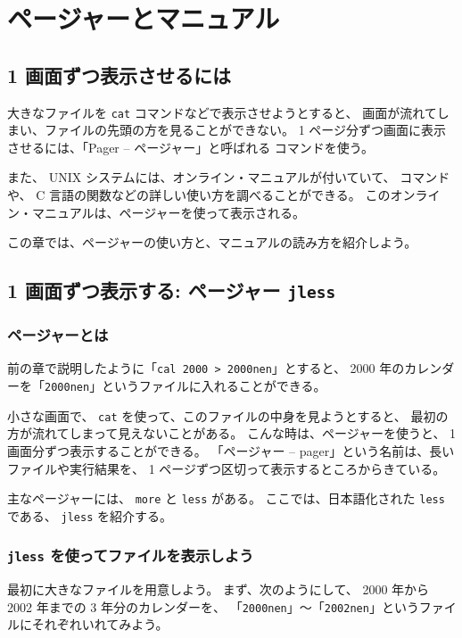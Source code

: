\chapter{ページャーとマニュアル}

\section*{1 画面ずつ表示させるには}

大きなファイルを \texttt{cat} コマンドなどで表示させようとすると、
画面が流れてしまい、ファイルの先頭の方を見ることができない。
 1 ページ分ずつ画面に表示させるには、「Pager -- ページャー」と呼ばれる
コマンドを使う。

また、 UNIX システムには、オンライン・マニュアルが付いていて、
コマンドや、 C 言語の関数などの詳しい使い方を調べることができる。
このオンライン・マニュアルは、ページャーを使って表示される。

この章では、ページャーの使い方と、マニュアルの読み方を紹介しよう。

\section{1 画面ずつ表示する: ページャー \texttt{jless}}

\subsection{ページャーとは}

前の章で説明したように「\texttt{cal 2000 > 2000nen}」とすると、
 2000 年のカレンダーを「\texttt{2000nen}」というファイルに入れることができる。

小さな画面で、 \texttt{cat} を使って、このファイルの中身を見ようとすると、
最初の方が流れてしまって見えないことがある。
こんな時は、ページャーを使うと、 1 画面分ずつ表示することができる。
「ページャー -- pager」という名前は、長いファイルや実行結果を、
 1 ページずつ区切って表示するところからきている。

主なページャーには、 \texttt{more} と \texttt{less} がある。
ここでは、日本語化された \texttt{less} である、 \texttt{jless} を紹介する。

\subsection{\texttt{jless} を使ってファイルを表示しよう}

最初に大きなファイルを用意しよう。
まず、次のようにして、 2000 年から 2002 年までの 3 年分のカレンダーを、
「\texttt{2000nen}」〜「\texttt{2002nen}」というファイルにそれぞれいれてみよう。


